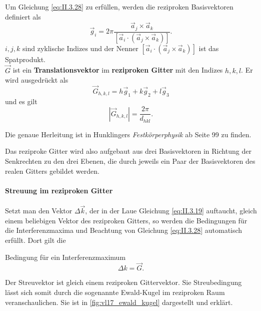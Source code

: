 	Um Gleichung \eqref{eq:II.3.28} zu erfüllen, werden die reziproken Basisvektoren definiert als
	\begin{equation}
		\label{II.3.29}
		\Vec{g}_{i} = 2\pi \frac{\Vec{a}_{j} \times \Vec{a}_{k}}{\left[ \Vec{a}_{i} \cdot\left( \Vec{a}_{j} \times \Vec{a}_{k} \right)  \right] }.
	\end{equation}
	$i,j,k$ sind zyklische Indizes und der Nenner $[\vec a_i\cdot(\vec a_j\times\vec a_k)]$ ist das Spatprodukt.\\

	$\Vec{G}$ ist ein \textbf{Translationsvektor} im \textbf{reziproken Gitter} mit den Indizes $h,k,l$. Er wird ausgedrückt als
	\begin{equation}
		\label{eq:II.3.30}
		\Vec{G}_{h,k,l} = h\Vec{g}_{1} + k\Vec{g}_{2} + l\Vec{g}_{3}
	\end{equation}
	und es gilt 
	\begin{equation}
		\label{eq:II.3.31}
		\left| \Vec{G}_{h,k,l} \right|  = \frac{2\pi}{d_{hkl}} .
	\end{equation} 

	\begin{verbal}
		Die genaue Herleitung ist in Hunklingers \textit{Festkörperphysik} ab Seite 99 zu finden.
	\end{verbal}
	Das reziproke Gitter wird also aufgebaut aus drei Basisvektoren in Richtung der Senkrechten zu den drei Ebenen, die durch jeweils ein Paar der Basisvektoren des realen Gitters gebildet werden.

\paragraph{Streuung im reziproken Gitter}

	Setzt man den Vektor $\Delta \Vec{k}$, der in der Laue Gleichung \eqref{eq:II.3.19} auftaucht, gleich einem beliebigen Vektor des reziproken Gitters, so werden die Bedingungen für die Interferenzmaxima und Beachtung von Gleichung \eqref{eq:II.3.28} automatisch erfüllt.
	Dort gilt die
	\begin{important}
		Bedingung für ein Interferenzmaximum\\
		\begin{equation}
			\label{eq:II.3.32}
			\Delta k = \Vec{G}.
		\end{equation}
	\end{important}

	Der Streuvektor ist gleich einem reziproken Gittervektor. Sie Streubedingung lässt sich somit durch die sogenannte {Ewald-Kugel} im reziproken Raum veranschaulichen. Sie ist in \autoref{fig:vl17_ewald_kugel} dargestellt und erklärt.\\

